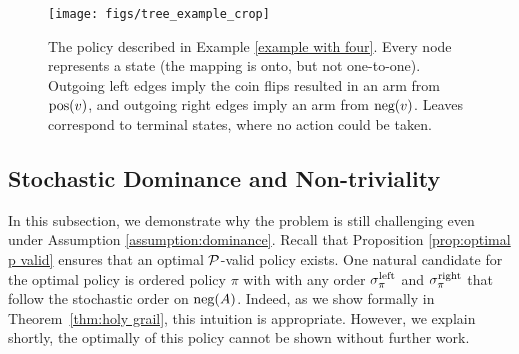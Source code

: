 \begin{figure}[t]
\centering
\texttt{[image: figs/tree\_example\_crop]}%
\caption{The policy described in Example \ref{example with four}.  
Every node represents a state (the mapping is onto, but not one-to-one). Outgoing left edges imply the coin flips resulted in an arm from $\textnormal{pos}(v)$, and outgoing right edges imply an arm from $\textnormal{neg}(v)$. Leaves correspond to terminal states, where no action could be taken. \label{fig:tree example}
}%
\end{figure}

\iffalse
\subsection{Stochastic Dominance and Non-triviality}\label{subsec:stopchastic}
In this subsection, we demonstrate why the problem is still challenging even under Assumption \ref{assumption:dominance}. Recall that Proposition \ref{prop:optimal p valid} ensures that an optimal $\mathcal{P}$-valid policy exists. One natural candidate for the optimal policy is ordered policy $\pi$ with with any order $\sigma^{\textnormal{left}}_\pi$ and $\sigma^{\textnormal{right}}_\pi$ that follow the stochastic order on $\textnormal{neg}(A)$. Indeed, as we show formally in Theorem~\ref{thm:holy grail}, this intuition is appropriate. However, we explain shortly, the optimally of this policy cannot be shown without further work.

